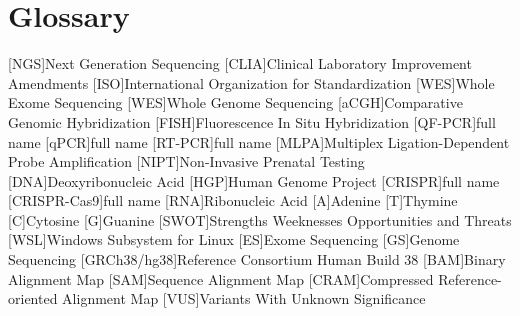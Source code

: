 \chapter{Glossary}

\footnotesize
\SingleSpacing

\begin{multicols}{2}
\begin{acronym}[AAAAAA]

	[NGS]{Next Generation Sequencing}
	[CLIA]{Clinical Laboratory Improvement Amendments}
	[ISO]{International Organization for Standardization}
	[WES]{Whole Exome Sequencing}
	[WES]{Whole Genome Sequencing}
	[aCGH]{Comparative Genomic Hybridization}
	[FISH]{Fluorescence In Situ Hybridization}
	[QF-PCR]{full name}
	[qPCR]{full name}
	[RT-PCR]{full name}
	[MLPA]{Multiplex Ligation-Dependent Probe Amplification}
	[NIPT]{Non-Invasive Prenatal Testing}
	[DNA]{Deoxyribonucleic Acid}
	[HGP]{Human Genome Project}
	[CRISPR]{full name}
	[CRISPR-Cas9]{full name}
	[RNA]{Ribonucleic Acid}
	{Adenine}
	{Thymine}
	{Cytosine}
	{Guanine}
	[SWOT]{Strengths Weeknesses Opportunities and Threats}
	[WSL]{Windows Subsystem for Linux}
	[ES]{Exome Sequencing}
	[GS]{Genome Sequencing}
	[GRCh38/hg38]{Reference Consortium Human Build 38}
	[BAM]{Binary Alignment Map}
	[SAM]{Sequence Alignment Map}
	[CRAM]{Compressed Reference-oriented Alignment Map}
	[VUS]{Variants With Unknown Significance}


\end{acronym}
\end{multicols}

